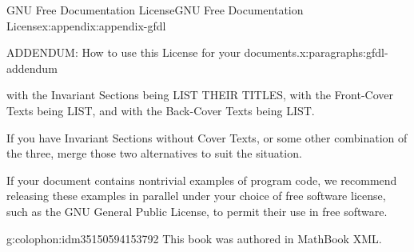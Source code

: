 \documentclass[twoside,10pt,]{tufte-book}
\newcommand{\xreffont}{\relax}
\numberwithin{equation}{part}
\providecommand\phantomsection{}
\begin{document}
\begin{appendixptx}{GNU Free Documentation License}{}{GNU Free Documentation License}{}{}{x:appendix:appendix-gfdl}
\begin{paragraphs}{ADDENDUM: How to use this License for your documents.}{x:paragraphs:gfdl-addendum}
\begin{preformatted}
with the Invariant Sections being LIST THEIR TITLES, with the
Front-Cover Texts being LIST, and with the Back-Cover Texts being LIST.
\end{preformatted}
If you have Invariant Sections without Cover Texts, or some other combination of the three, merge those two alternatives to suit the situation.%
\par
If your document contains nontrivial examples of program code, we recommend releasing these examples in parallel under your choice of free software license, such as the GNU General Public License, to permit their use in free software.%
\end{paragraphs}%
\end{appendixptx}
%
\backmatter%
%
\clearpage\phantomsection%
%
%
{\xreffont\printindex}
%
\cleardoublepage
\pagestyle{empty}
\begin{backcolophon}{g:colophon:idm35150594153792}%
This book was authored in MathBook XML.%
\end{backcolophon}%
\end{document}
